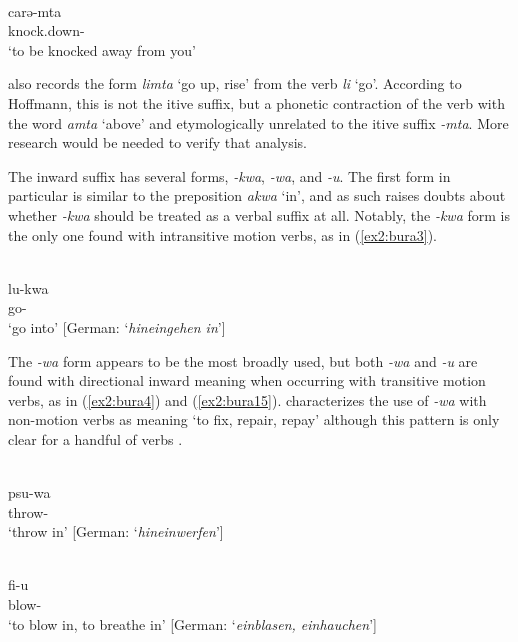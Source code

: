 \ex\label{ex2:bura2}
 \\
\gll carə-mta \\
knock.down- \\
\glt `to be knocked away from you'
\z 

\citet[289]{hoffmannUntersuchungenZurStruktur1955} also records the form \textit{limta} `go up, rise' from the verb \textit{li} `go'. According to Hoffmann, this is not the itive suffix, but a phonetic contraction of the verb with the word \textit{amta} `above' and etymologically unrelated to the itive suffix \textit{-mta}. More research would be needed to verify that analysis. 

The inward suffix has several forms, \textit{-kwa}, \textit{-wa}, and \textit{-u}. The first form in particular is similar to the preposition \textit{akwa} `in', and as such \citet[285]{hoffmannUntersuchungenZurStruktur1955} raises doubts about whether \textit{-kwa} should be treated as a verbal suffix at all. Notably, the \textit{-kwa} form is the only one found with intransitive motion verbs, as in (\ref{ex2:bura3}). 

\ea\label{ex2:bura3}
 \\
\gll lu-kwa \\
go-	\\
\glt `go into' [German: `\textit{hineingehen in}']
\z 

The \textit{-wa} form appears to be the most broadly used, but both \textit{-wa} and \textit{-u} are found with directional inward meaning when occurring with transitive motion verbs, as in (\ref{ex2:bura4}) and (\ref{ex2:bura15}). \citet{blenchBuraVerbalExtensions2010} characterizes the use of \textit{-wa} with non-motion verbs as meaning `to fix, repair, repay' although this pattern is only clear for a handful of verbs \citep[see also][320]{hoffmannUntersuchungenZurStruktur1955}.  

\ea\label{ex2:bura4}
 \\
\gll psu-wa \\
throw-	\\
\glt `throw in' [German: `\textit{hineinwerfen}']

\ex\label{ex2:bura15}
 \\
\gll fi-u \\
blow- \\
\glt `to blow in, to breathe in' [German: `\textit{einblasen, einhauchen}']
\z 

